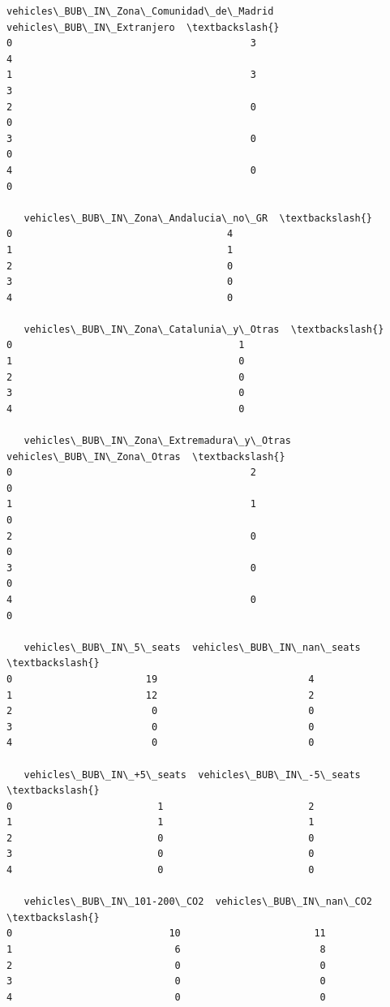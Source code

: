 \documentclass[11pt]{article}
\begin{document}
\begin{tcolorbox}[breakable, size=fbox, boxrule=.5pt, pad at break*=1mm, opacityfill=0]
\begin{Verbatim}[commandchars=\\\{\}]
   vehicles\_BUB\_IN\_Zona\_Comunidad\_de\_Madrid  vehicles\_BUB\_IN\_Extranjero  \textbackslash{}
0                                         3                           4
1                                         3                           3
2                                         0                           0
3                                         0                           0
4                                         0                           0

   vehicles\_BUB\_IN\_Zona\_Andalucia\_no\_GR  \textbackslash{}
0                                     4
1                                     1
2                                     0
3                                     0
4                                     0

   vehicles\_BUB\_IN\_Zona\_Catalunia\_y\_Otras  \textbackslash{}
0                                       1
1                                       0
2                                       0
3                                       0
4                                       0

   vehicles\_BUB\_IN\_Zona\_Extremadura\_y\_Otras  vehicles\_BUB\_IN\_Zona\_Otras  \textbackslash{}
0                                         2                           0
1                                         1                           0
2                                         0                           0
3                                         0                           0
4                                         0                           0

   vehicles\_BUB\_IN\_5\_seats  vehicles\_BUB\_IN\_nan\_seats  \textbackslash{}
0                       19                          4
1                       12                          2
2                        0                          0
3                        0                          0
4                        0                          0

   vehicles\_BUB\_IN\_+5\_seats  vehicles\_BUB\_IN\_-5\_seats  \textbackslash{}
0                         1                         2
1                         1                         1
2                         0                         0
3                         0                         0
4                         0                         0

   vehicles\_BUB\_IN\_101-200\_CO2  vehicles\_BUB\_IN\_nan\_CO2  \textbackslash{}
0                           10                       11
1                            6                        8
2                            0                        0
3                            0                        0
4                            0                        0


\end{Verbatim}
\end{tcolorbox}
\end{document}

